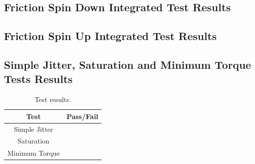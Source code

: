 



\clearpage

\subsection{Friction Spin Down Integrated Test Results}





\clearpage

\subsection{Friction Spin Up Integrated Test Results}





\clearpage

\subsection{Simple Jitter, Saturation and Minimum Torque Tests Results}

\begin{table}[htbp]
	\caption{Test results.}
	\label{tab:results}
	\centering \fontsize{10}{10}\selectfont
	\begin{tabular}{c | c } %
		\hline
		\textbf{Test} 				    & \textbf{Pass/Fail}  \\ \hline
		Simple Jitter  &  \\
		Saturation  &    \\ 
		Minimum Torque  &   \\ \hline
	\end{tabular}
\end{table}

\clearpage
